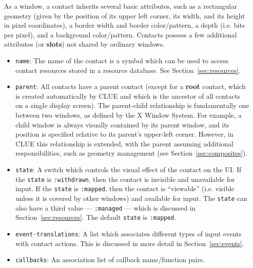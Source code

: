 As a window, a contact inherits several basic attributes,
such as a
rectangular geometry (given by the position of its upper left corner, its width,
and its height in
pixel coordinates), a border width and border color/pattern, a depth (i.e.
bits per pixel), and a background color/pattern.
Contacts possess a few additional attributes (or {\bf slots}) not shared
by ordinary windows. 
\begin{itemize}
\item {\tt name}: The name of
the contact is a
symbol  which can be used to access contact resources
stored in a resource database. See Section~\ref{sec:resources}.

\item {\tt parent}: All
contacts have a parent contact (except for a {\bf root} contact, which is
created automatically by CLUE and which is the ancestor of all contacts on a
single display screen).  The parent-child relationship
is fundamentally one between two windows, as defined by the X
Window System. For example, a child window is always visually
contained
by its parent window, and its position is specified relative to its
parent's upper-left corner. However, in CLUE this relationship is
extended, with the parent assuming additional responsibilities, such as
geometry management (see Section~\ref{sec:composites}).

\item {\tt state}: A switch which controls the visual effect of the contact on
the UI. If the {\tt state} is {\tt :withdrawn}, then the contact is invisible and
unavailable for input. If the {\tt state} is {\tt :mapped}, then the contact is
``viewable'' (i.e. visible unless it is covered by other windows) and available
for input. The {\tt state} can also have a third value --- {\tt :managed} ---
which is discussed in
Section~\ref{sec:resources}. The default {\tt state} is {\tt :mapped}.


\item {\tt event-translations}: A list which associates
different types of input events with contact actions. This is discussed in more
detail in Section~\ref{sec:events}.

\item {\tt callbacks}: An association list of callback name/function pairs.
\end{itemize}

